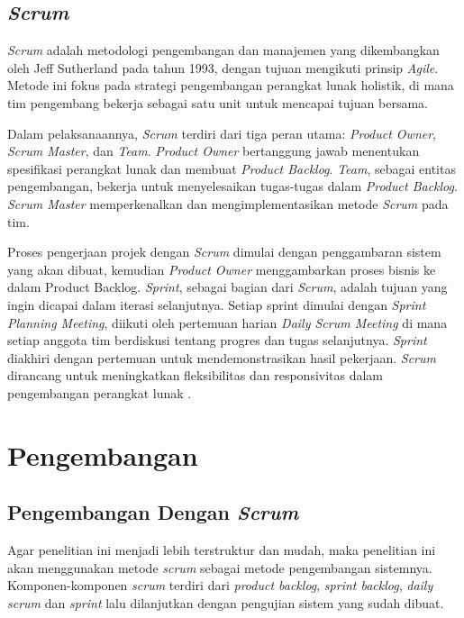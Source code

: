 \documentclass[
	a4paper, %
	10pt, %
	unnumberedsections, %
	twoside, %
]{LTJournalArticle}
\begin{document}
\subsection{\textit{Scrum}}

\textit{Scrum} adalah metodologi pengembangan dan manajemen yang dikembangkan oleh Jeff Sutherland pada tahun 1993, dengan tujuan mengikuti prinsip \textit{Agile}. Metode ini fokus pada strategi pengembangan perangkat lunak holistik, di mana tim pengembang bekerja sebagai satu unit untuk mencapai tujuan bersama.

Dalam pelaksanaannya, \textit{Scrum} terdiri dari tiga peran utama: \textit{Product Owner}, \textit{Scrum Master}, dan \textit{Team}. \textit{Product Owner} bertanggung jawab menentukan spesifikasi perangkat lunak dan membuat \textit{Product Backlog}. \textit{Team}, sebagai entitas pengembangan, bekerja untuk menyelesaikan tugas-tugas dalam \textit{Product Backlog}. \textit{Scrum Master} memperkenalkan dan mengimplementasikan metode \textit{Scrum} pada tim.

Proses pengerjaan projek dengan \textit{Scrum} dimulai dengan penggambaran sistem yang akan dibuat, kemudian \textit{Product Owner} menggambarkan proses bisnis ke dalam Product Backlog. \textit{Sprint}, sebagai bagian dari \textit{Scrum}, adalah tujuan yang ingin dicapai dalam iterasi selanjutnya. Setiap sprint dimulai dengan \textit{Sprint Planning Meeting}, diikuti oleh pertemuan harian \textit{Daily Scrum Meeting} di mana setiap anggota tim berdiskusi tentang progres dan tugas selanjutnya. \textit{Sprint} diakhiri dengan pertemuan untuk mendemonstrasikan hasil pekerjaan. \textit{Scrum} dirancang untuk meningkatkan fleksibilitas dan responsivitas dalam pengembangan perangkat lunak \cite{scrum}.


\section{Pengembangan}

\subsection{Pengembangan Dengan \textit{Scrum}}
Agar penelitian ini menjadi lebih terstruktur dan mudah, maka penelitian ini
akan menggunakan metode \textit{scrum} sebagai metode pengembangan sistemnya.
Komponen-komponen \textit{scrum} terdiri dari \textit{product backlog}, \textit{sprint backlog}, \textit{daily scrum} dan \textit{sprint} lalu dilanjutkan dengan pengujian sistem yang sudah dibuat.
\end{document}
